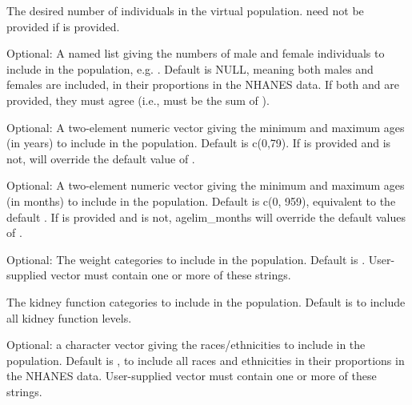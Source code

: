\documentclass[a4paper]{book}
\begin{document}
%
\begin{Arguments}
\begin{ldescription}
\item[\code{nsamp}] The desired number of individuals in the virtual population.
 need not be provided if  is provided.

\item[\code{gendernum}] Optional: A named list giving the numbers of male and
female individuals to include in the population, e.g. . Default is NULL, meaning both males and females are included,
in their proportions in the NHANES data. If both  and
 are provided, they must agree (i.e.,  must be
the sum of ).

\item[\code{agelim\_years}] Optional: A two-element numeric vector giving the
minimum and maximum ages (in years) to include in the population. Default is
c(0,79). If  is provided and  is not,
 will override the default value of .

\item[\code{agelim\_months}] Optional: A two-element numeric vector giving the
minimum and maximum ages (in months) to include in the population. Default
is c(0, 959), equivalent to the default . If
 is provided and  is not,
agelim\_months will override the default values of .

\item[\code{weight\_category}] Optional: The weight categories to include in the
population. Default is . User-supplied vector must contain one or more of these strings.

\item[\code{gfr\_category}] The kidney function categories to include in the
population. Default is 
to include all kidney function levels.

\item[\code{reths}] Optional: a character vector giving the races/ethnicities to
include in the population. Default is , to include
all races and ethnicities in their proportions in the NHANES data.
User-supplied vector must contain one or more of these strings.
\end{ldescription}
\end{Arguments}
\end{document}

